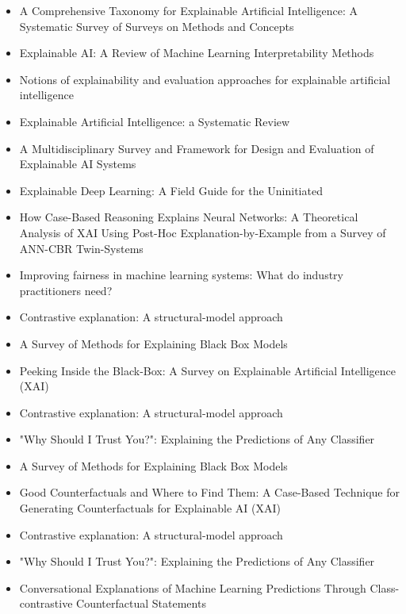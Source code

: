 \documentclass[manuscript,screen,review]{acmart}
\begin{document}
\begin{itemize}
    \item A Comprehensive Taxonomy for Explainable Artificial Intelligence: A Systematic Survey of Surveys on Methods and Concepts\cite{Schwalbe2021}
    \item Explainable AI: A Review of Machine Learning Interpretability Methods\cite{Linardatos2021}
    \item Notions of explainability and evaluation approaches for explainable artificial intelligence\cite{Vilone2021}
    \item Explainable Artificial Intelligence: a Systematic Review\cite{Vilone2020}
    \item A Multidisciplinary Survey and Framework for Design and Evaluation of Explainable AI Systems\cite{Mohseni2021}
    \item Explainable Deep Learning: A Field Guide for the Uninitiated\cite{Ras2020}
    \item How Case-Based Reasoning Explains Neural Networks: A Theoretical Analysis of XAI Using Post-Hoc Explanation-by-Example from a Survey of ANN-CBR Twin-Systems\cite{Keane2019}
    \item Improving fairness in machine learning systems: What do industry practitioners need?\cite{Holstein2019}
    \item Contrastive explanation: A structural-model approach\cite{Miller2021}
    \item A Survey of Methods for Explaining Black Box Models\cite{Guidotti2018a}
    \item Peeking Inside the Black-Box: A Survey on Explainable Artificial Intelligence (XAI)\cite{Adadi2018}
    \item Contrastive explanation: A structural-model approach\cite{Miller2021}  \item "Why Should I Trust You?": Explaining the Predictions of Any Classifier\cite{Ribeiro2016}
    \item A Survey of Methods for Explaining Black Box Models\cite{Guidotti2018a}
    \item Good Counterfactuals and Where to Find Them: A Case-Based Technique for Generating Counterfactuals for Explainable AI (XAI)\cite{Keane2020}
    \item Contrastive explanation: A structural-model approach\cite{Miller2021}
    \item "Why Should I Trust You?": Explaining the Predictions of Any Classifier\cite{Ribeiro2016}
    \item Conversational Explanations of Machine Learning Predictions Through Class-contrastive Counterfactual Statements\cite{Sokol2018}

\end{itemize}
\end{document}
